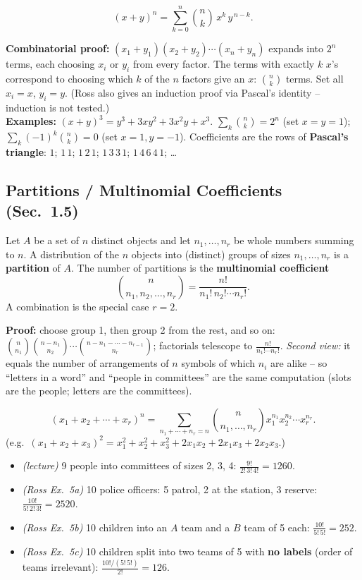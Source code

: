 \documentclass[11pt]{article}
\let\oldsubsection\subsection
\renewcommand{\subsection}{\Needspace{14\baselineskip}\oldsubsection}
\newcommand{\nCr}[2]{\binom{#1}{#2}}
\newcommand{\multi}[2]{\binom{#1}{#2}}
\begin{document}
\begin{thmbox}
\[ (x+y)^n=\sum_{k=0}^{n}\nCr nk\,x^k\,y^{\,n-k}. \]
\end{thmbox}
\textbf{Combinatorial proof:} $(x_1+y_1)(x_2+y_2)\cdots(x_n+y_n)$ expands into $2^n$ terms, each choosing $x_i$ or $y_i$ from every factor. The terms with exactly $k$ $x$'s correspond to choosing which $k$ of the $n$ factors give an $x$: $\nCr nk$ terms. Set all $x_i=x$, $y_i=y$. (Ross also gives an induction proof via Pascal's identity -- induction is not tested.)\\
\textbf{Examples:} $(x+y)^3=y^3+3xy^2+3x^2y+x^3$. $\sum_k\nCr nk=2^n$ (set $x=y=1$); $\sum_k(-1)^k\nCr nk=0$ (set $x=1,y=-1$). Coefficients are the rows of \textbf{Pascal's triangle}: $1$; $1\,1$; $1\,2\,1$; $1\,3\,3\,1$; $1\,4\,6\,4\,1$; \dots

\subsection{Partitions / Multinomial Coefficients (Sec.\ 1.5)}

\begin{defbox}[Partition]
Let $A$ be a set of $n$ distinct objects and let $n_1,\dots,n_r$ be whole numbers summing to $n$. A distribution of the $n$ objects into (distinct) groups of sizes $n_1,\dots,n_r$ is a \textbf{partition} of $A$. The number of partitions is the \textbf{multinomial coefficient}
\[ \multi{n}{n_1,n_2,\dots,n_r}=\frac{n!}{n_1!\,n_2!\cdots n_r!}. \]
A combination is the special case $r=2$.
\end{defbox}
\textbf{Proof:} choose group 1, then group 2 from the rest, and so on:
$\nCr{n}{n_1}\nCr{n-n_1}{n_2}\cdots\nCr{n-n_1-\cdots-n_{r-1}}{n_r}$; factorials telescope to $\frac{n!}{n_1!\cdots n_r!}$.
\emph{Second view:} it equals the number of arrangements of $n$ symbols of which $n_i$ are alike -- so ``letters in a word'' and ``people in committees'' are the same computation (slots are the people; letters are the committees).

\begin{thmbox}
\[ (x_1+x_2+\cdots+x_r)^n=\sum_{n_1+\cdots+n_r=n}\multi n{n_1,\dots,n_r}x_1^{n_1}x_2^{n_2}\cdots x_r^{n_r}. \]
(e.g.\ $(x_1+x_2+x_3)^2=x_1^2+x_2^2+x_3^2+2x_1x_2+2x_1x_3+2x_2x_3$.)
\end{thmbox}

\begin{exbox}[Examples]
\begin{itemize}
\item \emph{(lecture)} 9 people into committees of sizes 2, 3, 4: $\frac{9!}{2!\,3!\,4!}=1260$.
\item \emph{(Ross Ex.\ 5a)} 10 police officers: 5 patrol, 2 at the station, 3 reserve: $\frac{10!}{5!\,2!\,3!}=2520$.
\item \emph{(Ross Ex.\ 5b)} 10 children into an $A$ team and a $B$ team of 5 each: $\frac{10!}{5!\,5!}=252$.
\item \emph{(Ross Ex.\ 5c)} 10 children split into two teams of 5 with \textbf{no labels} (order of teams irrelevant): $\frac{10!/(5!\,5!)}{2!}=126$.
\end{itemize}
\end{exbox}
\end{document}
